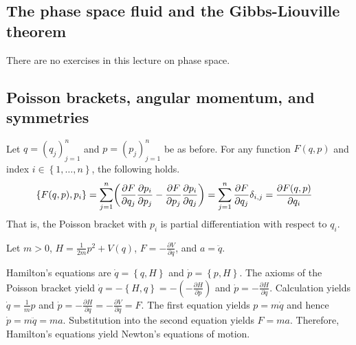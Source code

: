 \subsection{The phase space fluid and the Gibbs-Liouville theorem}

There are no exercises in this lecture on phase space.

\subsection{Poisson brackets, angular momentum, and symmetries}

\begin{answer}
	Let $q=(q_j)_{j=1}^n$ and $p=(p_j)_{j=1}^n$ be as before.
	For any function $F(q, p)$ and index $i \in \left\{1, \dots, n\right\}$, the following holds.
	\begin{align}
		\left\{F(q,p), p_i\right\}
		 & =  \sum_{j=1}^n \!\left(\frac{\partial F}{\partial q_j} \frac{\partial p_i}{\partial p_j} - \frac{\partial F}{\partial p_j} \frac{\partial p_i}{\partial q_j}\right)
		= \sum_{j=1}^n \frac{\partial F}{\partial q_j} \delta_{i,j}
		= \frac{\partial F(q,p)}{\partial q_i}
	\end{align}
	That is, the Poisson bracket with $p_i$ is partial differentiation with respect to $q_i$.
\end{answer}

\begin{answer}
	Let $m > 0$, $H = \frac{1}{2m} p^2 + V(q)$, $F = - \frac{\partial V}{\partial q}$, and $a = \ddot{q}$.

	Hamilton's equations are $\dot{q} = \left\{q, H\right\}$ and $\dot{p} = \left\{p, H\right\}$.
	The axioms of the Poisson bracket yield $\dot{q} = - \left\{H, q\right\} = - \left(-\frac{\partial H}{\partial p}\right)$ and $\dot{p} = - \frac{\partial H}{\partial q}$.
	Calculation yields $\dot{q} = \frac{1}{m} p$ and $\dot{p} = - \frac{\partial H}{\partial q} = - \frac{\partial V}{\partial q} = F$.
	The first equation yields $p = m \dot{q}$ and hence $\dot{p} = m \ddot{q} = ma$.
	Substitution into the second equation yields $F = ma$.
	Therefore, Hamilton's equations yield Newton's equations of motion.
\end{answer}

